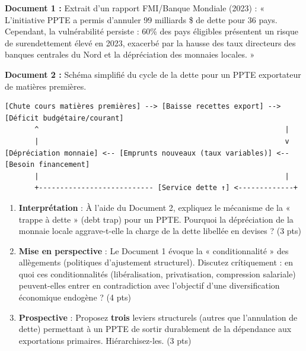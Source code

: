 \documentclass[11pt]{article}
\begin{document}
\begin{exercice}
\noindent \textbf{Document 1 :} Extrait d'un rapport FMI/Banque Mondiale (2023) : « L'initiative PPTE a permis d'annuler 99 milliards \$ de dette pour 36 pays. Cependant, la vulnérabilité persiste : 60\% des pays éligibles présentent un risque de surendettement élevé en 2023, exacerbé par la hausse des taux directeurs des banques centrales du Nord et la dépréciation des monnaies locales. »

\textbf{Document 2 :} Schéma simplifié du cycle de la dette pour un PPTE exportateur de matières premières.
\begin{verbatim}
[Chute cours matières premières] --> [Baisse recettes export] --> [Déficit budgétaire/courant]
       ^                                                          |
       |                                                          v
[Dépréciation monnaie] <-- [Emprunts nouveaux (taux variables)] <-- [Besoin financement]
       |                                                          |
       +--------------------------- [Service dette ↑] <-------------+
\end{verbatim}

\begin{enumerate}
    \item \textbf{Interprétation} : À l'aide du Document 2, expliquez le mécanisme de la « trappe à dette » (debt trap) pour un PPTE. Pourquoi la dépréciation de la monnaie locale aggrave-t-elle la charge de la dette libellée en devises ? (3 pts)
    \item \textbf{Mise en perspective} : Le Document 1 évoque la « conditionnalité » des allègements (politiques d'ajustement structurel). Discutez crítiquement : en quoi ces conditionnalités (libéralisation, privatisation, compression salariale) peuvent-elles entrer en contradiction avec l'objectif d'une diversification économique endogène ? (4 pts)
    \item \textbf{Prospective} : Proposez \textbf{trois} leviers structurels (autres que l'annulation de dette) permettant à un PPTE de sortir durablement de la dépendance aux exportations primaires. Hiérarchisez-les. (3 pts)
\end{enumerate}
\end{exercice}
\end{document}
